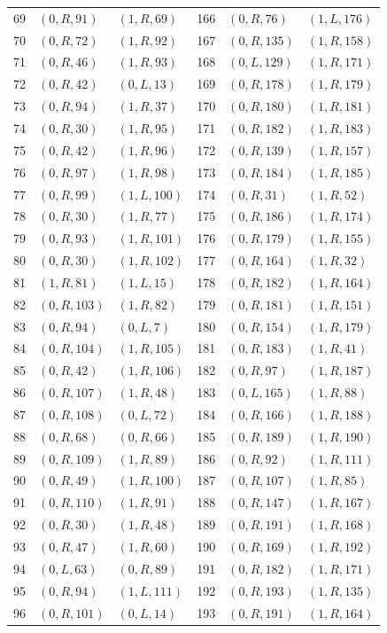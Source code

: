 \begin{longtable}{r@{\quad}ll@{\qquad}r@{\quad}ll}
69 & $(0,R,91)$ & $(1,R,69)$ & 166 & $(0,R,76)$ & $(1,L,176)$\\
70 & $(0,R,72)$ & $(1,R,92)$ & 167 & $(0,R,135)$ & $(1,R,158)$\\
71 & $(0,R,46)$ & $(1,R,93)$ & 168 & $(0,L,129)$ & $(1,R,171)$\\
72 & $(0,R,42)$ & $(0,L,13)$ & 169 & $(0,R,178)$ & $(1,R,179)$\\
73 & $(0,R,94)$ & $(1,R,37)$ & 170 & $(0,R,180)$ & $(1,R,181)$\\
74 & $(0,R,30)$ & $(1,R,95)$ & 171 & $(0,R,182)$ & $(1,R,183)$\\
75 & $(0,R,42)$ & $(1,R,96)$ & 172 & $(0,R,139)$ & $(1,R,157)$\\
76 & $(0,R,97)$ & $(1,R,98)$ & 173 & $(0,R,184)$ & $(1,R,185)$\\
77 & $(0,R,99)$ & $(1,L,100)$ & 174 & $(0,R,31)$ & $(1,R,52)$\\
78 & $(0,R,30)$ & $(1,R,77)$ & 175 & $(0,R,186)$ & $(1,R,174)$\\
79 & $(0,R,93)$ & $(1,R,101)$ & 176 & $(0,R,179)$ & $(1,R,155)$\\
80 & $(0,R,30)$ & $(1,R,102)$ & 177 & $(0,R,164)$ & $(1,R,32)$\\
81 & $(1,R,81)$ & $(1,L,15)$ & 178 & $(0,R,182)$ & $(1,R,164)$\\
82 & $(0,R,103)$ & $(1,R,82)$ & 179 & $(0,R,181)$ & $(1,R,151)$\\
83 & $(0,R,94)$ & $(0,L,7)$ & 180 & $(0,R,154)$ & $(1,R,179)$\\
84 & $(0,R,104)$ & $(1,R,105)$ & 181 & $(0,R,183)$ & $(1,R,41)$\\
85 & $(0,R,42)$ & $(1,R,106)$ & 182 & $(0,R,97)$ & $(1,R,187)$\\
86 & $(0,R,107)$ & $(1,R,48)$ & 183 & $(0,L,165)$ & $(1,R,88)$\\
87 & $(0,R,108)$ & $(0,L,72)$ & 184 & $(0,R,166)$ & $(1,R,188)$\\
88 & $(0,R,68)$ & $(0,R,66)$ & 185 & $(0,R,189)$ & $(1,R,190)$\\
89 & $(0,R,109)$ & $(1,R,89)$ & 186 & $(0,R,92)$ & $(1,R,111)$\\
90 & $(0,R,49)$ & $(1,R,100)$ & 187 & $(0,R,107)$ & $(1,R,85)$\\
91 & $(0,R,110)$ & $(1,R,91)$ & 188 & $(0,R,147)$ & $(1,R,167)$\\
92 & $(0,R,30)$ & $(1,R,48)$ & 189 & $(0,R,191)$ & $(1,R,168)$\\
93 & $(0,R,47)$ & $(1,R,60)$ & 190 & $(0,R,169)$ & $(1,R,192)$\\
94 & $(0,L,63)$ & $(0,R,89)$ & 191 & $(0,R,182)$ & $(1,R,171)$\\
95 & $(0,R,94)$ & $(1,L,111)$ & 192 & $(0,R,193)$ & $(1,R,135)$\\
96 & $(0,R,101)$ & $(0,L,14)$ & 193 & $(0,R,191)$ & $(1,R,164)$\\
\end{longtable}
\normalsize
\clearpage
